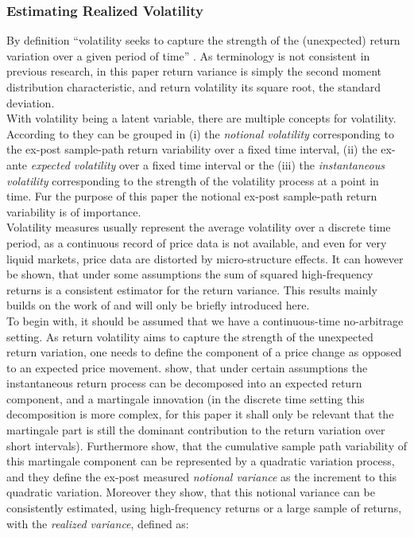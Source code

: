 \subsubsection{Estimating Realized Volatility}\label{sec:221RV}
By definition ``volatility seeks to capture the strength of the (unexpected) return variation over a given period of time'' \parencite[p.7]{andersen2001}. As terminology is not consistent in previous research, in this paper return variance is simply the second moment distribution characteristic, and return volatility its square root, the standard deviation. \\
With volatility being a latent variable, there are multiple concepts for volatility. According to \citeauthor{andersen2001} they can be grouped in (i) the \emph{notional volatility} corresponding to the ex-post sample-path return variability over a fixed time interval, (ii) the ex-ante \emph{expected volatility} over a fixed time interval or the (iii) the \emph{instantaneous volatility} corresponding to the strength of the volatility process at a point in time. Fur the purpose of this paper the notional ex-post sample-path return variability is of importance.\\
Volatility measures usually represent the average volatility over a discrete time period, as a continuous record of price data is not available, and even for very liquid markets, price data are distorted by micro-structure effects. It can however be shown, that under some assumptions the sum of squared high-frequency returns is a consistent estimator for the return variance. This results mainly builds on the work of \parencite{andersen2001} and will only be briefly introduced here.\\
To begin with, it should be assumed that we have a continuous-time no-arbitrage setting. As return volatility aims to capture the strength of the unexpected return variation, one needs to define the component of a price change as opposed to an expected price movement. \textcite{andersen2001} show, that under certain assumptions the instantaneous return process can be decomposed into an expected return component, and a martingale innovation (in the discrete time setting this decomposition is more complex, for this paper it shall only be relevant that the martingale part is still the dominant contribution to the return variation over short intervals). Furthermore \textcite{andersen2001} show, that the cumulative sample path variability of this martingale component can be represented by a quadratic variation process, and they define the ex-post measured \emph{notional variance} as the increment to this quadratic variation. Moreover they show, that this notional variance can be consistently estimated, using high-frequency returns or a large sample of returns, with the \emph{realized variance}, defined as:
